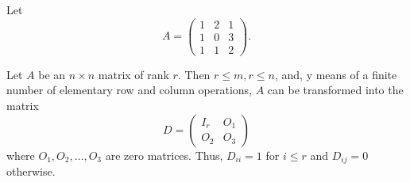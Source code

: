\begin{eg}
    Let 
    \[  A = \begin{pmatrix} 
        1 & 2 & 1 \\
        1 & 0 & 3 \\
        1 & 1 & 2 
              \end{pmatrix}. \]
\end{eg}

\begin{theorem}
    Let \( A  \) be an \( n \times n  \) matrix of rank \( r  \). Then \( r \leq m, r \leq n  \), and, y means of a finite number of elementary row and column operations, \( A  \) can be transformed into the matrix 
    \[  D = \begin{pmatrix}
        {I}_{r} & {O}_{1} \\
        {O}_{2} & {O}_{3}
    \end{pmatrix} \]
    where \( {O}_{1}, {O}_{2}, \dots, {O}_{3} \) are zero matrices. Thus, \( {D}_{ii} = 1  \) for \( i \leq r  \) and \( {D}_{ij} = 0  \) otherwise.
\end{theorem}



